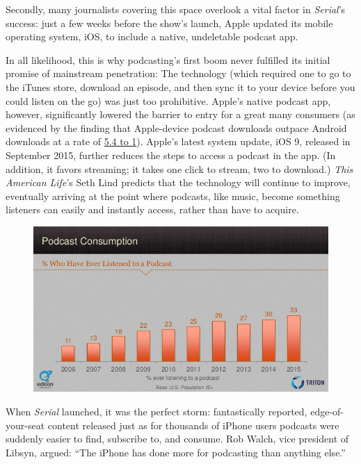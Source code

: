 \documentclass[notoc, symmetric, nobib, nols]{towcenter-guideto-book}
\begin{document}
Secondly, many journalists covering this space overlook a vital factor in \textit{Serial}'s success: just a few weeks before the show's launch, Apple updated its mobile operating system, iOS, to include a native, undeletable podcast app. 

In all likelihood, this is why podcasting's first boom never fulfilled its initial promise of mainstream penetration: The technology (which required one to go to the iTunes store, download an episode, and then sync it to your device before you could listen on the go) was just too prohibitive. Apple's native podcast app, however, significantly lowered the barrier to entry for a great many consumers (as evidenced by the finding that Apple-device podcast downloads outpace Android downloads at a rate of \href{http://www.libsyn.com/wp-content/uploads/2015/06/PRLibsynNetGrowth021915Final.pdf}{5.4 to 1}).\autocite{libsyndata} Apple's latest system update, iOS 9, released in September 2015, further reduces the steps to access a podcast in the app. (In addition, it favors streaming; it takes one click to stream, two to download.) \textit{This American Life}'s Seth Lind predicts that the technology will continue to improve, eventually arriving at the point where podcasts, like music, become something listeners can easily and instantly access, rather than have to acquire.\autocite{lind} 

\begin{figure}
\begin{centering}
\includegraphics[width=.9\textwidth]{graphics/PODCAST15_EdPCconsumer_listened.jpg}
\caption{}
\end{centering}
\end{figure}

When \textit{Serial} launched, it was the perfect storm: fantastically reported, edge-of-your-seat content released just as for thousands of iPhone users podcasts were suddenly easier to find, subscribe to, and consume. Rob Walch, vice president of Libsyn, argued: ``The iPhone has done more for podcasting than anything else.''\autocite{Walch}
\end{document}
